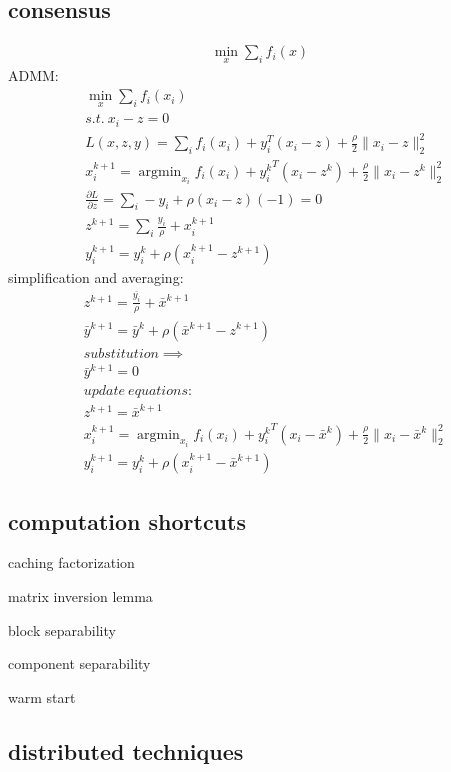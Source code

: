 \documentclass[8pt]{report}
\DeclareMathOperator*{\argmin}{argmin}
\newcommand{\norm}[1]{\|#1\|}
\begin{document}
\begin{multicols*}{2}
  \subsection{consensus}
  \begin{align*}
    \min_x \sum_i f_i(x)
  \end{align*}
  ADMM:
  \begin{align*}
    &\min_x \sum_i f_i(x_i)\\
    &s.t.\ x_i-z=0\\
    &L(x,z,y) = \sum_i f_i(x_i)+y_i^T(x_i-z) + \frac{\rho}{2}\norm{x_i-z}_2^2\\
    &x_i^{k+1}=\argmin_{x_i} f_i(x_i)+{y_i^k}^T(x_i-z^k) + \frac{\rho}{2}\norm{x_i-z^k}_2^2\\
    &\frac{\partial L}{\partial z} = \sum_i -y_i + \rho (x_i-z)(-1)=0\\
    &z^{k+1} = \sum_i \frac{y_i}{\rho} + x_i^{k+1}\\
    &y_i^{k+1} = y_i^k + \rho(x_i^{k+1} - z^{k+1})
  \end{align*}
  simplification and averaging:
  \begin{align*}
    &z^{k+1} = \frac{\bar{y_i}}{\rho} + \bar{x}^{k+1}\\
    &\bar{y}^{k+1} = \bar{y}^k + \rho(\bar{x}^{k+1} - z^{k+1})\\
    &substitution \implies\\
    &\bar{y}^{k+1} = 0\\
    &update\ equations:\\
    &z^{k+1} = \bar{x}^{k+1}\\
    &x_i^{k+1}=\argmin_{x_i} f_i(x_i)+{y_i^k}^T(x_i-\bar{x}^k) + \frac{\rho}{2}\norm{x_i-\bar{x}^k}_2^2\\
    &y_i^{k+1} = y_i^k + \rho(x_i^{k+1} - \bar{x}^{k+1})
  \end{align*}  

  \subsection{computation shortcuts}

  caching factorization

  matrix inversion lemma

  block separability

  component separability

  warm start

  \subsection{distributed techniques}


\end{multicols*}
\end{document}
